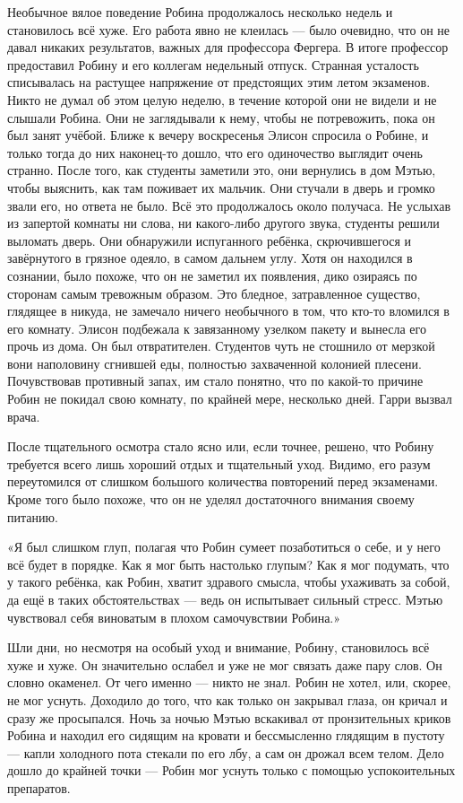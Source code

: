 \documentclass[a4paper,12pt]{book}
\begin{document}
	Необычное вялое поведение Робина продолжалось несколько недель и становилось всё хуже. Его работа явно не клеилась — было очевидно, что он не давал никаких результатов, важных для профессора Фергера. В итоге профессор предоставил Робину и его коллегам недельный отпуск. Странная усталость списывалась на растущее напряжение от предстоящих этим летом экзаменов.
	Никто не думал об этом целую неделю, в течение которой они не видели и не слышали Робина. Они не заглядывали к нему, чтобы не потревожить, пока он был занят учёбой.
	Ближе к вечеру воскресенья Элисон спросила о Робине, и только тогда до них наконец-то дошло, что его одиночество выглядит очень странно.
	После того, как студенты заметили это, они вернулись в дом Мэтью, чтобы выяснить, как там поживает их мальчик.
	Они стучали в дверь и громко звали его, но ответа не было. Всё это продолжалось около получаса. Не услыхав из запертой комнаты ни слова, ни какого-либо другого звука, студенты решили выломать дверь.
	Они обнаружили испуганного ребёнка, скрючившегося и завёрнутого в грязное одеяло, в самом дальнем углу. Хотя он находился в сознании, было похоже, что он не заметил их появления, дико озираясь по сторонам самым тревожным образом. Это бледное, затравленное существо, глядящее в никуда, не замечало ничего необычного в том, что кто-то вломился в его комнату.
	Элисон подбежала к завязанному узелком пакету и вынесла его прочь из дома.
	Он был отвратителен. Студентов чуть не стошнило от мерзкой вони наполовину сгнившей еды, полностью захваченной колонией плесени. Почувствовав противный запах, им стало понятно, что по какой-то причине Робин не покидал свою комнату, по крайней мере, несколько дней.
	Гарри вызвал врача. 

	После тщательного осмотра стало ясно или, если точнее, решено, что Робину требуется всего лишь хороший отдых и тщательный уход. Видимо, его разум переутомился от слишком большого количества повторений перед экзаменами. Кроме того было похоже,  что он не уделял достаточного внимания своему питанию.

	«Я был слишком глуп, полагая что Робин сумеет позаботиться о себе, и у него всё будет в порядке. Как я мог быть настолько глупым? Как я мог подумать, что у такого ребёнка, как Робин, хватит здравого смысла, чтобы ухаживать за собой, да ещё в таких обстоятельствах — ведь он испытывает сильный стресс.
	Мэтью чувствовал себя виноватым в плохом самочувствии Робина.»

	Шли дни, но несмотря на особый уход и внимание, Робину, становилось всё хуже и хуже. Он значительно ослабел и уже не мог связать даже пару слов. Он словно окаменел. От чего именно — никто не знал.
	Робин не хотел, или, скорее, не мог уснуть. Доходило до того, что как только он закрывал глаза, он кричал и сразу же просыпался.
	Ночь за ночью Мэтью вскакивал от пронзительных криков Робина и находил его сидящим на кровати и бессмысленно глядящим в пустоту — капли холодного пота стекали по его лбу, а сам он дрожал всем телом. Дело дошло до крайней точки — Робин мог уснуть только с помощью успокоительных препаратов.
	
\end{document}
